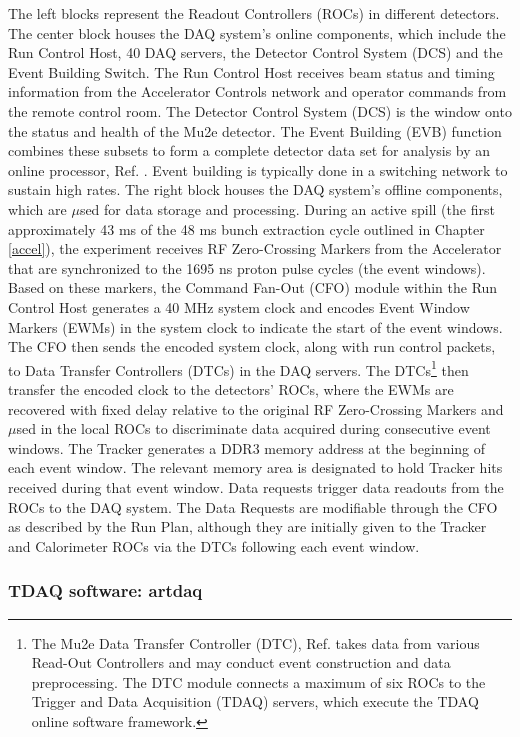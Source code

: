 The left blocks represent the Readout Controllers (ROCs) in different detectors. The center block houses the DAQ system's online components, which include the Run Control Host, 40 DAQ servers, the Detector Control System (DCS) and the Event Building Switch. The Run Control Host receives beam status and timing information from the Accelerator Controls network and operator commands from the remote control room. The Detector Control System (DCS) is the window onto the status and health of the Mu2e detector. The Event Building (EVB) function combines these subsets to form a complete detector data set for analysis by an online processor, Ref. \cite{bartoszek2015mu2e}. Event building is typically done in a switching network to sustain high rates. The right block houses the DAQ system's offline components, which are $\mu$sed for data storage and processing. During an active spill (the first approximately 43 ms of the 48 ms bunch extraction cycle outlined in Chapter \ref{accel}), the experiment receives RF Zero-Crossing Markers from the Accelerator that are synchronized to the 1695 ns proton pulse cycles (the event windows). Based on these markers, the Command Fan-Out (CFO) module within the Run Control Host generates a 40 MHz system clock and encodes Event Window Markers (EWMs) in the system clock to indicate the start of the event windows. The CFO then sends the encoded system clock, along with run control packets, to Data Transfer Controllers (DTCs) in the DAQ servers. The DTCs\footnote{The Mu2e Data Transfer Controller (DTC), Ref. \cite{ryan} takes data from various Read-Out Controllers and may conduct event construction and data preprocessing. The DTC module connects a maximum of six ROCs to the Trigger and Data Acquisition (TDAQ) servers, which execute the TDAQ online software framework.} then transfer the encoded clock to the detectors' ROCs, where the EWMs are recovered with fixed delay relative to the original RF Zero-Crossing Markers and $\mu$sed in the local ROCs to discriminate data acquired during consecutive event windows. The Tracker generates a DDR3 memory address at the beginning of each event window. The relevant memory area is designated to hold Tracker hits received during that event window. Data requests trigger data readouts from the ROCs to the DAQ system. The Data Requests are modifiable through the CFO as described by the Run Plan, although they are initially given to the Tracker and Calorimeter ROCs via the DTCs following each event window.

\subsubsection{TDAQ software: artdaq}





